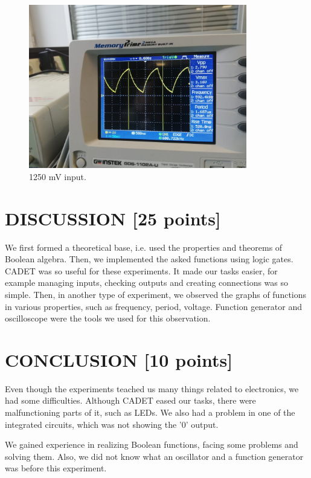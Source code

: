 \documentclass[pdftex,12pt,a4paper]{article}
\begin{document}
\begin{figure}[H]
	\centering
	\includegraphics[width=0.85\textwidth]{osc3.jpg}	
	\caption{1250 mV input.}
	\label{fig14}
\end{figure}

\section{DISCUSSION [25 points]}
We first formed a theoretical base, i.e. used the properties and theorems of Boolean algebra. Then, we implemented the asked functions using logic gates. CADET was so useful for these experiments. It made our tasks easier, for example managing inputs, checking outputs and creating connections was so simple. Then, in another type of experiment, we observed the graphs of functions in various properties, such as frequency, period, voltage. Function generator and oscilloscope were the tools we used for this observation.

\section{CONCLUSION [10 points]}
Even though the experiments teached us many things related to electronics, we had some difficulties. Although CADET eased our tasks, there were malfunctioning parts of it, such as LEDs. We also had a problem in one of the integrated circuits, which was not showing the '0' output.

We gained experience in realizing Boolean functions, facing some problems and solving them. Also, we did not know what an oscillator and a function generator was before this experiment.

\newpage
{}



\end{document}
